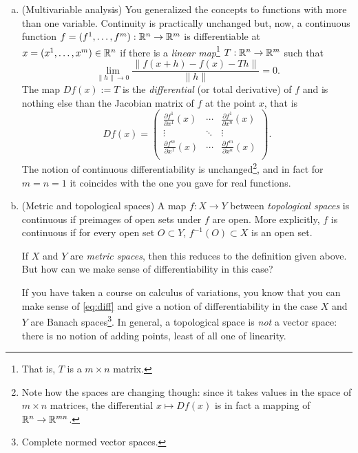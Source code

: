 \begin{enumerate}[a)]
  \item (Multivariable analysis) You generalized the concepts to functions with more than one variable.
  Continuity is practically unchanged but, now, a continuous function $f=(f^1, \ldots, f^m):\mathbb{R}^n\to\mathbb{R}^m$ is differentiable at $x=(x^1,\ldots,x^m)\in\mathbb{R}^n$ if there is a \emph{linear map}\footnote{That is, $T$ is a $m\times n$ matrix.} $T: \mathbb{R}^n\to\mathbb{R}^m$ such that
  \begin{equation}\label{eq:diff}
    \lim_{\|h\|\to 0} \frac{\|f(x+h) - f(x) - T h\|}{\|h\|} = 0.
  \end{equation}
  The map $Df(x) := T$ is the \emph{differential} (or total derivative) of $f$ and is nothing else than the Jacobian matrix of $f$ at the point $x$, that is
  \begin{equation}\label{eq:jacobian}
    Df(x) = \begin{pmatrix}
      \frac{\partial f^1}{\partial x^1}(x) & \cdots & \frac{\partial f^1}{\partial x^n}(x) \\
      \vdots & \ddots & \vdots \\
      \frac{\partial f^m}{\partial x^1}(x) & \cdots & \frac{\partial f^m}{\partial x^n}(x) \\
    \end{pmatrix}.
  \end{equation} 
  The notion of continuous differentiability is unchanged\footnote{Note how the spaces are changing though: since it takes values in the space of $m\times n$ matrices, the differential $x\mapsto Df(x)$ is in fact a mapping of $\mathbb{R}^n \to \mathbb{R}^{mn}$.}, and in fact for $m=n=1$ it coincides with the one you gave for real functions.
  
  \item (Metric and topological spaces) A map $f:X\to Y$ between \emph{topological spaces} is continuous if preimages of open sets under $f$ are open. More explicitly, $f$ is continuous if for every open set $O\subset Y$, $f^{-1}(O)\subset X$ is an open set.

  If $X$ and $Y$ are \emph{metric spaces}, then this reduces to the definition given above.
  But how can we make sense of differentiability in this case? 
  
  If you have taken a course on calculus of variations, you know that you can make sense of \eqref{eq:diff} and give a notion of differentiability in the case $X$ and $Y$ are Banach spaces\footnote{Complete normed vector spaces.}.
  In general, a topological space is \emph{not} a vector space: there is no notion of adding points, least of all one of linearity.
\end{enumerate}

